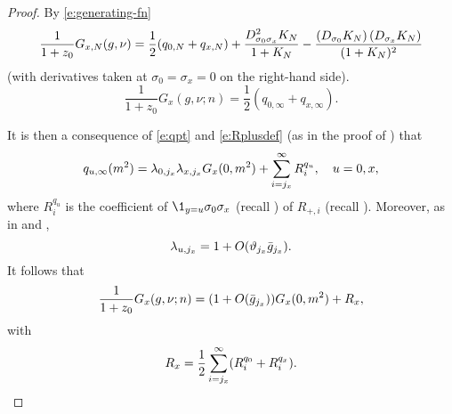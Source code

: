 \begin{proof}
By \eqref{e:generating-fn}
\begin{equation}
\lbeq{GK}
\frac{1}{1+z_0} G_{x,N}(g, \nu)
	=
\frac{1}{2} (q_{0,N} + q_{x,N})
	+
\frac{D^2_{\sigma_0\sigma_x}K_{N}}{1 + K_{N}}
	-
\frac{\left(D_{\sigma_0}K_{N}\right) \left(D_{\sigma_x}K_{N}\right)}{(1 + K_{N})^2}
\end{equation}
(with derivatives taken at $\sigma_0=\sigma_x=0$ on the right-hand side).
\begin{equation}
\frac{1}{1+z_0} G_x(g, \nu; n) = \frac{1}{2} (q_{0,\infty} + q_{x,\infty}).
\end{equation}

It is then a consequence of
\eqref{e:qpt} and \eqref{e:Rplusdef} (as in the proof of \cite[Lemma~\ref{phi4-lem:qflow}]{ST-phi4}) that
\begin{equation}
\label{e:q}
q_{u,\infty}(m^2)
= \lambda_{0, j_x} \lambda_{x, j_x}  G_x(0, m^2) + \sum_{i = j_x}^\infty R^{q_u}_i,
\quad u = 0, x,
\end{equation}
where $R^{q_u}_i$ is the coefficient of $\1_{y=u}\sigma_0\sigma_x$ (recall )
of $R_{+,i}$ (recall ).
Moreover, as in \cite[\eqref{phi4-e:lam-star}]{ST-phi4} and \cite[Corollary~\ref{phi4-cor:vx}]{ST-phi4},
\begin{equation}
\lambda_{u,j_x} = 1 + O(\vartheta_{j_x} \bar{g}_{j_x}).
\end{equation}
It follows that
\begin{equation}
\frac{1}{1+z_0} G_x(g, \nu; n) = (1 + O(\bar{g}_{j_x})) G_x(0, m^2) + R_x,
\end{equation}
with
\begin{equation}
\label{e:Rabdef}
R_x = \frac{1}{2} \sum_{i=j_x}^\infty (R^{q_0}_i + R^{q_x}_i).
\end{equation}


\end{proof}
